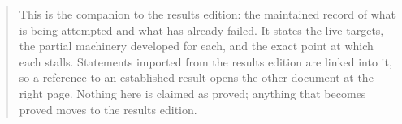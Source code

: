 \maketitle
\begin{abstract}
This is the companion to the results edition: the maintained record of what is
being attempted and what has already failed.  It states the live targets, the
partial machinery developed for each, and the exact point at which each stalls.
Statements imported from the results edition are linked into it, so a reference
to an established result opens the other document at the right page.  Nothing
here is claimed as proved; anything that becomes proved moves to the results
edition.
\end{abstract}
